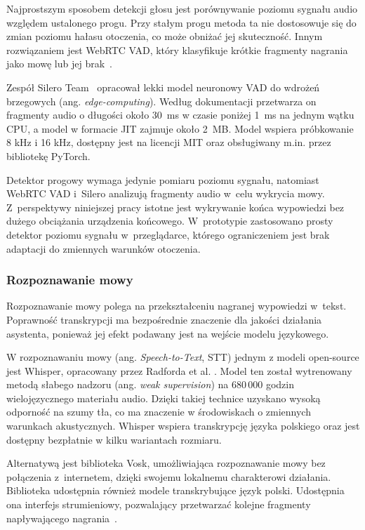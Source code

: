 Najprostszym sposobem detekcji głosu jest porównywanie poziomu sygnału audio względem ustalonego progu. Przy stałym progu metoda ta nie dostosowuje się do zmian poziomu hałasu otoczenia, co może obniżać jej skuteczność. Innym rozwiązaniem jest WebRTC VAD, który klasyfikuje krótkie fragmenty nagrania jako mowę lub jej brak~\cite{WebRTCVAD}.

Zespół Silero Team~\cite{SileroVAD} opracował lekki model neuronowy VAD do wdrożeń brzegowych (ang. \textit{edge-computing}). Według dokumentacji przetwarza on fragmenty audio o długości około 30~ms w czasie poniżej 1~ms na jednym wątku CPU, a model w formacie JIT zajmuje około 2~MB. Model wspiera próbkowanie 8 kHz i 16 kHz, dostępny jest na licencji MIT oraz obsługiwany m.in. przez bibliotekę PyTorch.

Detektor progowy wymaga jedynie pomiaru poziomu sygnału, natomiast WebRTC VAD i~Silero analizują fragmenty audio w~celu wykrycia mowy. Z~perspektywy niniejszej pracy istotne jest wykrywanie końca wypowiedzi bez dużego obciążania urządzenia końcowego. W~prototypie zastosowano prosty detektor poziomu sygnału w~przeglądarce, którego ograniczeniem jest brak adaptacji do zmiennych warunków otoczenia.

\subsubsection{Rozpoznawanie mowy}
\label{subsubsec:stt}

Rozpoznawanie mowy polega na przekształceniu nagranej wypowiedzi w~tekst. Poprawność transkrypcji ma bezpośrednie znaczenie dla jakości działania asystenta, ponieważ jej efekt podawany jest na wejście modelu językowego.

W rozpoznawaniu mowy (ang. \textit{Speech-to-Text}, STT) jednym z modeli open-source jest Whisper, opracowany przez Radforda et al. \cite{Radford2023}. Model ten został wytrenowany metodą słabego nadzoru (ang. \textit{weak supervision}) na 680\,000 godzin wielojęzycznego materiału audio. Dzięki takiej technice uzyskano wysoką odporność na szumy tła, co ma znaczenie w środowiskach o zmiennych warunkach akustycznych. Whisper wspiera transkrypcję języka polskiego oraz jest dostępny bezpłatnie w kilku wariantach rozmiaru.

Alternatywą jest biblioteka Vosk, umożliwiająca rozpoznawanie mowy bez połączenia z~internetem, dzięki swojemu lokalnemu charakterowi działania. Biblioteka udostępnia również modele transkrybujące język polski. Udostępnia ona interfejs strumieniowy, pozwalający przetwarzać kolejne fragmenty napływającego nagrania~\cite{VoskDocumentation}.

